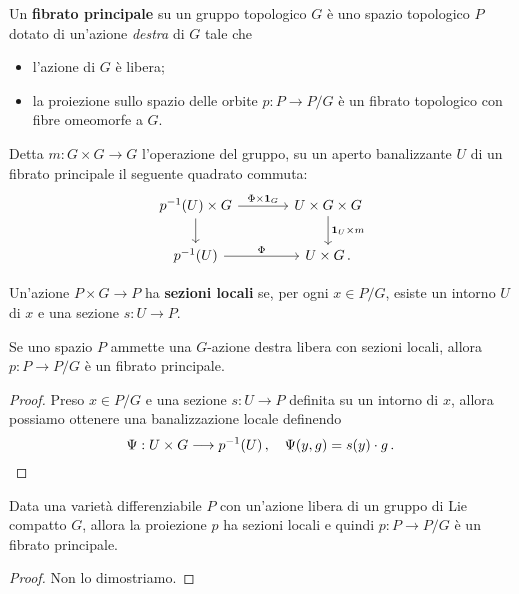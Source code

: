 \begin{df}
	Un \textbf{fibrato principale} su un gruppo topologico $G$ è uno spazio topologico $P$
	dotato di un'azione \emph{destra} di $G$ tale che
	\begin{itemize}
		\item l'azione di $G$ è libera;
		\item la proiezione sullo spazio delle orbite $p: P \to P/G$
		è un fibrato topologico con fibre omeomorfe a $G$.
	\end{itemize}
\end{df}

Detta $m:G \times G \to G$ l'operazione del gruppo,
su un aperto banalizzante $U$ di un fibrato principale
il seguente quadrato commuta:
\begin{equation*}
	\begin{tikzcd}[column sep=large]
		p^{-1}(U) \times G \ar[r, "\Phi \times \cat{1}_{G}"] \ar[d] 
		& U \times G \times G \ar[d, "\cat{1}_{U} \times m"] \\
		p^{-1}(U) \ar[r, "\Phi"] & U \times G\,.
	\end{tikzcd}
\end{equation*}

\begin{df}
	Un'azione $P \times G \to P$ ha \textbf{sezioni locali} se, per ogni $x \in P/G$,
	esiste un intorno $U$ di  $x$ e una sezione $s:U \to P$.
\end{df}

\begin{prop}
	Se uno spazio $P$ ammette una $G$-azione destra libera con sezioni locali,
	allora $p:P \to P/G$ è un fibrato principale.
	\begin{proof}
		Preso $x \in P/G$ e una sezione $s:U \to P$ definita su un intorno di $x$,
		allora possiamo ottenere una banalizzazione locale definendo
		\begin{equation*}
			\Psi : U \times G \longrightarrow p^{-1}(U)\,, \quad
			\Psi(y,g) = s(y) \cdot g\,.	\qedhere
		\end{equation*}
	\end{proof}
\end{prop}

\begin{thm}
	Data una varietà differenziabile $P$ con un'azione libera di un gruppo di Lie compatto $G$,
	allora la proiezione $p$ ha sezioni locali e quindi $p:P \to P/G$ è un fibrato principale.
	\begin{proof}
		Non lo dimostriamo.
	\end{proof}
\end{thm}

